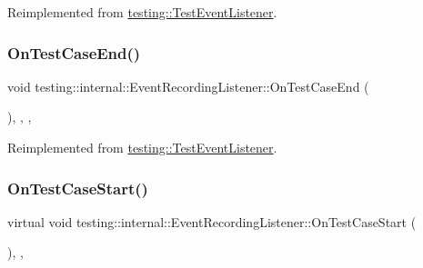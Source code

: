 Reimplemented from \mbox{\hyperlink{classtesting_1_1_test_event_listener_a6cada1572dde8010b94f6dd237ce52f4}{testing\+::\+Test\+Event\+Listener}}.

\mbox{\label{classtesting_1_1internal_1_1_event_recording_listener_a52788314427f5c7a4585ea0bf5f3c251}} 
\subsubsection{\texorpdfstring{OnTestCaseEnd()}{OnTestCaseEnd()}\hspace{0.1cm}{\footnotesize\ttfamily [3/3]}}
{\footnotesize\ttfamily void testing\+::internal\+::\+Event\+Recording\+Listener\+::\+On\+Test\+Case\+End (\begin{DoxyParamCaption}\item[{const \mbox{\hyperlink{classtesting_1_1_test_case}{Test\+Case}} \&}]{ }\end{DoxyParamCaption})\hspace{0.3cm}{\ttfamily [inline]}, {\ttfamily [override]}, {\ttfamily [protected]}, {\ttfamily [virtual]}}



Reimplemented from \mbox{\hyperlink{classtesting_1_1_test_event_listener_a6cada1572dde8010b94f6dd237ce52f4}{testing\+::\+Test\+Event\+Listener}}.

\mbox{\label{classtesting_1_1internal_1_1_event_recording_listener_a18c28e1d1c3a1e74e225966456786f8e}} 
\subsubsection{\texorpdfstring{OnTestCaseStart()}{OnTestCaseStart()}\hspace{0.1cm}{\footnotesize\ttfamily [1/3]}}
{\footnotesize\ttfamily virtual void testing\+::internal\+::\+Event\+Recording\+Listener\+::\+On\+Test\+Case\+Start (\begin{DoxyParamCaption}\item[{const \mbox{\hyperlink{classtesting_1_1_test_case}{Test\+Case}} \&}]{ }\end{DoxyParamCaption})\hspace{0.3cm}{\ttfamily [inline]}, {\ttfamily [protected]}, {\ttfamily [virtual]}}



